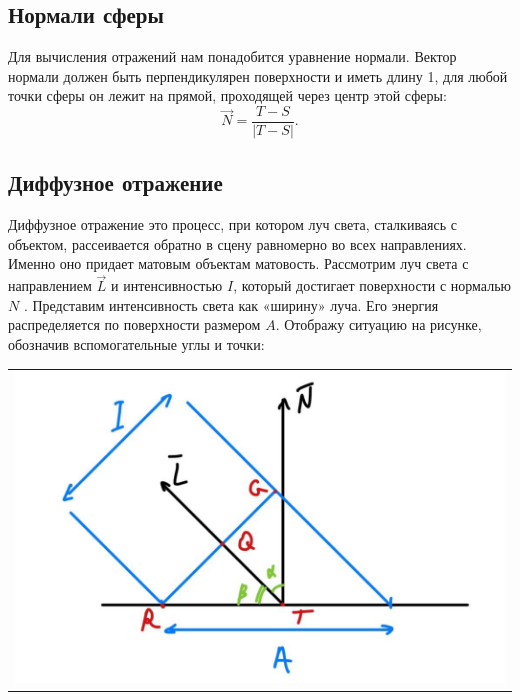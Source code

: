 \subsection{Нормали сферы}

Для вычисления отражений нам понадобится уравнение нормали. Вектор нормали должен быть перпендикулярен поверхности и иметь длину 1, для любой точки сферы он лежит на прямой, проходящей через центр этой сферы:
\begin{equation}
	\vec{N}=\frac{T-S}{|T-S|}.
\end{equation}

\subsection{Диффузное отражение}

Диффузное отражение это процесс, при котором луч света, сталкиваясь с объектом, рассеивается обратно в сцену равномерно во всех направлениях. Именно оно придает матовым объектам матовость.
Рассмотрим луч света с направлением $\vec{L}$ и интенсивностью $I$, который достигает поверхности с нормалью $N$ . Представим интенсивность света как «ширину» луча. Его энергия распределяется по поверхности размером $A$. Отображу ситуацию на рисунке, обозначив вспомогательные углы и точки:

\begin{table}[H]
	\centering
	\begin{tabular}{p{1\linewidth}}
		\centering
		\includegraphics[height=0.4\linewidth]{include/2-1.png}
		\captionof{figure}{Диффузное отражение света}
		\label{img:2-1}
	\end{tabular}
\end{table}

